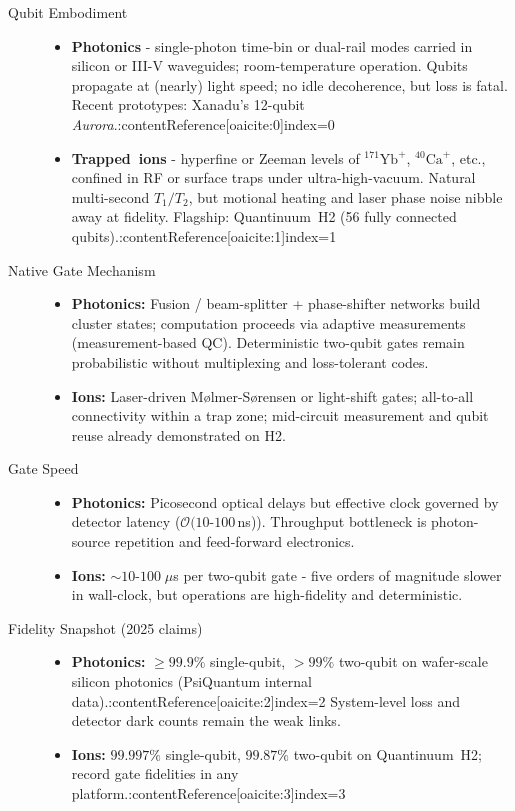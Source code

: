 \documentclass[11pt,a4paper]{article}
\begin{document}
\begin{description}
	\item[Qubit Embodiment]
	\begin{itemize}
		\item \textbf{Photonics} - single-photon time-bin or dual-rail modes carried in silicon or III-V waveguides; room-temperature operation.  Qubits propagate at (nearly) light speed; no idle decoherence, but loss is fatal.  Recent prototypes: Xanadu’s 12-qubit \emph{Aurora}.:contentReference[oaicite:0]{index=0}
		\item \textbf{Trapped ions} - hyperfine or Zeeman levels of ${}^{171}\mathrm{Yb}^+$, ${}^{40}\mathrm{Ca}^+$, etc., confined in RF or surface traps under ultra-high-vacuum.  Natural multi-second $T_1/T_2$, but motional heating and laser phase noise nibble away at fidelity.  Flagship: Quantinuum H2 (56 fully connected qubits).:contentReference[oaicite:1]{index=1}
	\end{itemize}
	
	\item[Native Gate Mechanism]
	\begin{itemize}
		\item \textbf{Photonics:} Fusion / beam-splitter + phase-shifter networks build cluster states; computation proceeds via adaptive measurements (measurement-based QC).  Deterministic two-qubit gates remain probabilistic without multiplexing and loss-tolerant codes.
		\item \textbf{Ions:} Laser-driven Mølmer-Sørensen or light-shift gates; all-to-all connectivity within a trap zone; mid-circuit measurement and qubit reuse already demonstrated on H2.
	\end{itemize}
	
	\item[Gate Speed]
	\begin{itemize}
		\item \textbf{Photonics:} Picosecond optical delays but effective clock governed by detector latency ($\mathcal{O}(10$-$100\,$ns)).  Throughput bottleneck is photon-source repetition and feed-forward electronics.
		\item \textbf{Ions:} $\sim\!10$-$100\;\mu$s per two-qubit gate - five orders of magnitude slower in wall-clock, but operations are high-fidelity and deterministic.
	\end{itemize}
	
	\item[Fidelity Snapshot (2025 claims)]
	\begin{itemize}
		\item \textbf{Photonics:} $\ge \!99.9\%$ single-qubit, $>99\%$ two-qubit on wafer-scale silicon photonics (PsiQuantum internal data).:contentReference[oaicite:2]{index=2}  System-level loss and detector dark counts remain the weak links.
		\item \textbf{Ions:} $99.997\%$ single-qubit, $99.87\%$ two-qubit on Quantinuum H2; record gate fidelities in any platform.:contentReference[oaicite:3]{index=3}
	\end{itemize}
	

\end{description}
\end{document}
